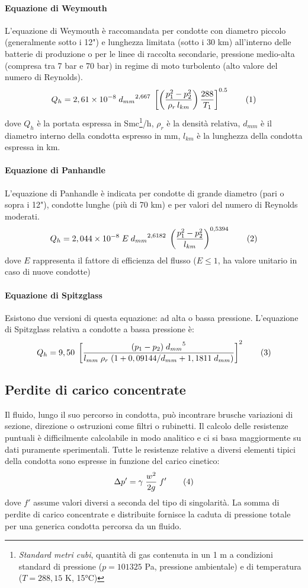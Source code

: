 \paragraph{Equazione di Weymouth}
L'equazione di Weymouth è raccomandata per condotte con diametro piccolo (generalmente sotto i 12") e lunghezza limitata (sotto i 30 km) all'interno delle batterie di produzione o per le linee di raccolta secondarie, pressione medio-alta (compresa tra 7 bar e 70 bar) in regime di moto turbolento (alto valore del numero di Reynolds).
\[Q_h=2,61\e{-8} \; {d_{mm}}^{2,667} \; \left[ \left(\dfrac{p_1^2 - p_2^2}{\rho_r \, l_{km}}\right) \dfrac{288}{T_1} \right]^{0.5} \addtag \label{eq:weymouth} \]
dove \(Q_h\) è la portata espressa in Smc\footnote{\textit{Standard metri cubi}, quantità di gas contenuta in un 1 m a condizioni standard di pressione (\(p=101325\) Pa, pressione ambientale) e di temperatura  (\(T=288,15\) K, 15°C)}/h, \(\rho_r\) è la densità relativa, \(d_{mm}\) è il diametro interno della condotta espresso in mm, \(l_{km}\) è la lunghezza della condotta espressa in km.

\paragraph{Equazione di Panhandle}
L'equazione di Panhandle è indicata per condotte di grande diametro (pari o sopra i 12"), condotte lunghe (più di 70 km) e per valori del numero di Reynolds moderati. 
\[Q_h=2,044\e{-8} \; E \;{d_{mm}}^{2,6182} \; \left( \dfrac{p_1^2 - p_2^2}{l_{km}} \right)^{0,5394} \addtag \label{eq:pandhandle} \]
dove \(E\) rappresenta il fattore di efficienza del flusso (\(E \leq 1\), ha valore unitario in caso di nuove condotte)

\paragraph{Equazione di Spitzglass}
Esistono due versioni di questa equazione: ad alta o bassa pressione. L'equazione di Spitzglass relativa a condotte a bassa pressione è:
\[Q_h = 9,50 \; \left[ \dfrac{(p_1-p_2) \; {d_{mm}}^5 }{l_{mm} \; \rho_r \; (1+0,09144/d_{mm} + 1,1811 \; d_{mm}) } \right]^2 \addtag \label{eq:spitzglass}\]


\subsection{Perdite di carico concentrate}
Il fluido, lungo il suo percorso in condotta, può incontrare brusche variazioni di sezione, direzione o ostruzioni come filtri o rubinetti. Il calcolo delle resistenze puntuali è difficilmente calcolabile in modo analitico e ci si basa maggiormente su dati puramente sperimentali. Tutte le resistenze relative a diversi elementi tipici della condotta sono espresse in funzione del carico cinetico:
\[\Delta p' = \gamma \; \frac{w^2}{2g} \; f' \addtag \label{eq:concentrate}\]
dove \(f'\) assume valori diversi a seconda del tipo di singolarità. La somma di perdite di carico concentrate e distribuite fornisce la caduta di pressione totale per una generica condotta percorsa da un fluido.

